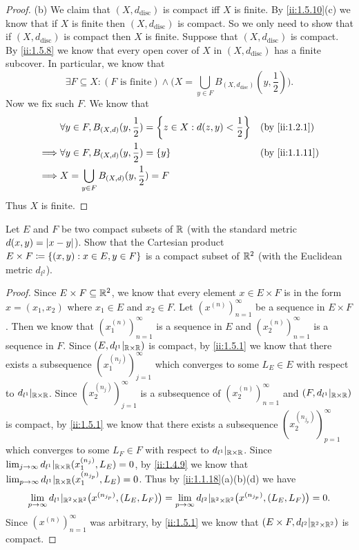 \begin{proof}{(b)}
  We claim that \((X, d_{\text{disc}})\) is compact iff \(X\) is finite.
  By \cref{ii:1.5.10}(c) we know that if \(X\) is finite then \((X, d_{\text{disc}})\) is compact.
  So we only need to show that if \((X, d_{\text{disc}})\) is compact then \(X\) is finite.
  Suppose that \((X, d_{\text{disc}})\) is compact.
  By \cref{ii:1.5.8} we know that every open cover of \(X\) in \((X, d_{\text{disc}})\) has a finite subcover.
  In particular, we know that
  \[
    \exists F \subseteq X : (F \text{ is finite}) \land \bigg(X = \bigcup_{y \in F} B_{(X, d_{\text{disc}})}(y, \dfrac{1}{2})\bigg).
  \]
  Now we fix such \(F\).
  We know that
  \begin{align*}
             & \forall y \in F, B_{(X, d)}(y, \dfrac{1}{2}) = \set{z \in X : d(z, y) < \dfrac{1}{2}} &  & \by{ii:1.2.1}  \\
    \implies & \forall y \in F, B_{(X, d)}(y, \dfrac{1}{2}) = \set{y}                                &  & \by{ii:1.1.11} \\
    \implies & X = \bigcup_{y \in F} B_{(X, d)}(y, \dfrac{1}{2}) = F
  \end{align*}
  Thus \(X\) is finite.
\end{proof}

\begin{ex}\label{ii:ex:1.5.13}
  Let \(E\) and \(F\) be two compact subsets of \(\mathbb{R}\) (with the standard metric \(d(x, y) = \left\lvert x - y\right\rvert\)).
  Show that the Cartesian product \(E \times F \coloneqq \left\lbrace(x, y) : x \in E, y \in F\right\rbrace\) is a compact subset of \(\mathbb{R}^2\) (with the Euclidean metric \(d_{l^2}\)).
\end{ex}

\begin{proof}
  Since \(E \times F \subseteq \mathbb{R}^2\), we know that every element \(x \in E \times F\) is in the form \(x = (x_1, x_2)\) where \(x_1 \in E\) and \(x_2 \in F\).
  Let \((x^{(n)})_{n = 1}^\infty\) be a sequence in \(E \times F\).
  Then we know that \((x_1^{(n)})_{n = 1}^\infty\) is a sequence in \(E\) and \((x_2^{(n)})_{n = 1}^\infty\) is a sequence in \(F\).
  Since \((E, d_{l^1}|_{\mathbb{R} \times \mathbb{R}})\) is compact, by \cref{ii:1.5.1} we know that there exists a subsequence \((x_1^{(n_j)})_{j = 1}^\infty\) which converges to some \(L_E \in E\) with respect to \(d_{l^1}|_{\mathbb{R} \times \mathbb{R}}\).
  Since \((x_2^{(n_j)})_{j = 1}^\infty\) is a subsequence of \((x_2^{(n)})_{n = 1}^\infty\) and \((F, d_{l^1}|_{\mathbb{R} \times \mathbb{R}})\) is compact, by \cref{ii:1.5.1} we know that there exists a subsequence \((x_2^{(n_{j_p})})_{p = 1}^\infty\) which converges to some \(L_F \in F\) with respect to \(d_{l^1}|_{\mathbb{R} \times \mathbb{R}}\).
  Since \(\lim_{j \to \infty} d_{l^1}|_{\mathbb{R} \times \mathbb{R}}(x_1^{(n_j)}, L_E) = 0\), by \cref{ii:1.4.9} we know that \(\lim_{p \to \infty} d_{l^1}|_{\mathbb{R} \times \mathbb{R}}(x_1^{(n_{j_p})}, L_E) = 0\).
  Thus by \cref{ii:1.1.18}(a)(b)(d) we have
  \[
    \lim_{p \to \infty} d_{l^1}|_{\mathbb{R}^2 \times \mathbb{R}^2}\big(x^{(n_{j_p})}, (L_E, L_F)\big) = \lim_{p \to \infty} d_{l^2}|_{\mathbb{R}^2 \times \mathbb{R}^2}\big(x^{(n_{j_p})}, (L_E, L_F)\big) = 0.
  \]
  Since \((x^{(n)})_{n = 1}^\infty\) was arbitrary, by \cref{ii:1.5.1} we know that \((E \times F, d_{l^2}|_{\mathbb{R}^2 \times \mathbb{R}^2})\) is compact.
\end{proof}

